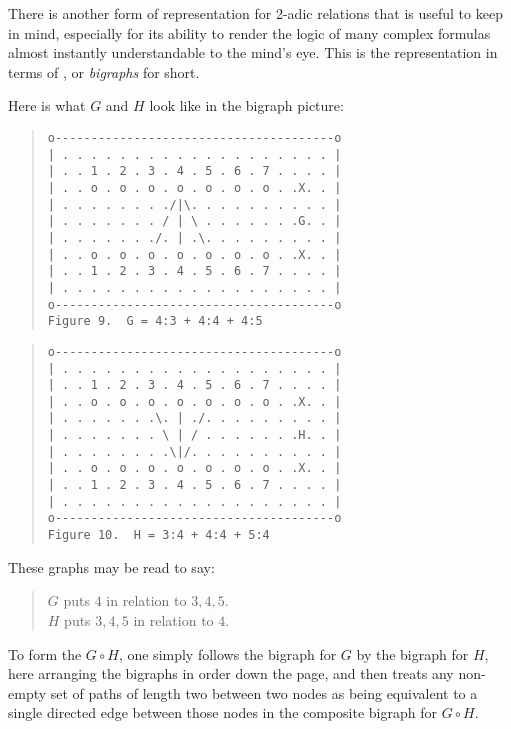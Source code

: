 \documentclass[12pt]{article}
\begin{document}

There is another form of representation for 2-adic relations that is useful to keep in mind, especially for its ability to render the logic of many complex formulas almost instantly understandable to the mind's eye.  This is the representation in terms of \textit{}, or \textit{bigraphs} for short.

Here is what $G$ and $H$ look like in the bigraph picture:

\begin{quote}\begin{verbatim}
o---------------------------------------o
| . . . . . . . . . . . . . . . . . . . |
| . . 1 . 2 . 3 . 4 . 5 . 6 . 7 . . . . |
| . . o . o . o . o . o . o . o . .X. . |
| . . . . . . . ./|\. . . . . . . . . . |
| . . . . . . . / | \ . . . . . . .G. . |
| . . . . . . ./. | .\. . . . . . . . . |
| . . o . o . o . o . o . o . o . .X. . |
| . . 1 . 2 . 3 . 4 . 5 . 6 . 7 . . . . |
| . . . . . . . . . . . . . . . . . . . |
o---------------------------------------o
Figure 9.  G = 4:3 + 4:4 + 4:5
\end{verbatim}\end{quote}

\begin{quote}\begin{verbatim}
o---------------------------------------o
| . . . . . . . . . . . . . . . . . . . |
| . . 1 . 2 . 3 . 4 . 5 . 6 . 7 . . . . |
| . . o . o . o . o . o . o . o . .X. . |
| . . . . . . .\. | ./. . . . . . . . . |
| . . . . . . . \ | / . . . . . . .H. . |
| . . . . . . . .\|/. . . . . . . . . . |
| . . o . o . o . o . o . o . o . .X. . |
| . . 1 . 2 . 3 . 4 . 5 . 6 . 7 . . . . |
| . . . . . . . . . . . . . . . . . . . |
o---------------------------------------o
Figure 10.  H = 3:4 + 4:4 + 5:4
\end{verbatim}\end{quote}

These graphs may be read to say:

\begin{quote}
$G$ puts $4$ in relation to $3, 4, 5$.
\\
$H$ puts $3, 4, 5$ in relation to $4$.
\end{quote}

To form the  $G \circ H$, one simply follows the bigraph for $G$ by the bigraph for $H$, here arranging the bigraphs in order down the page, and then treats any non-empty set of paths of length two between two nodes as being equivalent to a single directed edge between those nodes in the composite bigraph for $G \circ H$.
\end{document}
